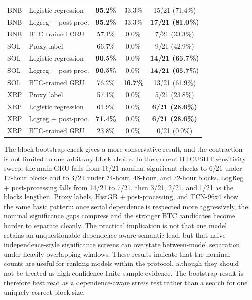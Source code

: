\documentclass[a4paper,fleqn]{cas-dc}
\begin{document}
\begin{table}[t]
\begin{tabular}{llccc}
BNB & Logistic regression & \textbf{95.2\%} & 33.3\% & 15/21 (71.4\%) \\
BNB & Logreg + post-proc. & \textbf{95.2\%} & 33.3\% & \textbf{17/21 (81.0\%)} \\
BNB & BTC-trained GRU & 57.1\% & 0.0\% & 7/21 (33.3\%) \\
\midrule
SOL & Proxy label & 66.7\% & 0.0\% & 9/21 (42.9\%) \\
SOL & Logistic regression & \textbf{90.5\%} & 0.0\% & \textbf{14/21 (66.7\%)} \\
SOL & Logreg + post-proc. & \textbf{90.5\%} & 0.0\% & \textbf{14/21 (66.7\%)} \\
SOL & BTC-trained GRU & 76.2\% & \textbf{16.7\%} & 13/21 (61.9\%) \\
\midrule
XRP & Proxy label & 57.1\% & 0.0\% & 5/21 (23.8\%) \\
XRP & Logistic regression & 61.9\% & 0.0\% & \textbf{6/21 (28.6\%)} \\
XRP & Logreg + post-proc. & \textbf{71.4\%} & 0.0\% & \textbf{6/21 (28.6\%)} \\
XRP & BTC-trained GRU & 23.8\% & 0.0\% & 0/21 (0.0\%) \\
\bottomrule
\end{tabular}
\end{table}

The block-bootstrap check gives a more conservative result, and the contraction is not limited to one arbitrary block choice. In the current BTCUSDT sensitivity sweep, the main GRU falls from 16/21 nominal significant checks to 6/21 under 12-hour blocks and to 3/21 under 24-hour, 48-hour, and 72-hour blocks. LogReg + post-processing falls from 14/21 to 7/21, then 3/21, 2/21, and 1/21 as the blocks lengthen. Proxy labels, HistGB + post-processing, and TCN-96x4 show the same basic pattern: once serial dependence is respected more aggressively, the nominal significance gaps compress and the stronger BTC candidates become harder to separate cleanly. The practical implication is not that one model retains an unquestionable dependence-aware semantic lead, but that naive independence-style significance screens can overstate between-model separation under heavily overlapping windows. These results indicate that the nominal counts are useful for ranking models within the protocol, although they should not be treated as high-confidence finite-sample evidence. The bootstrap result is therefore best read as a dependence-aware stress test rather than a search for one uniquely correct block size.
\end{document}
